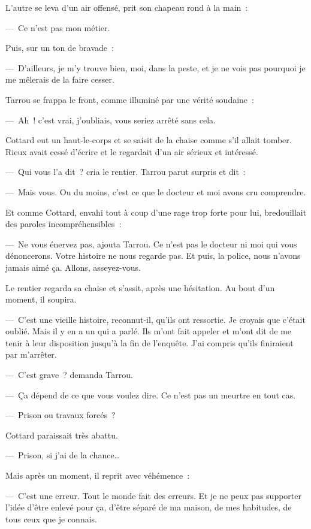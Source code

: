 \documentclass[french,twoside]{book} %
\begin{document}
L’autre se leva d’un air offensé, prit son chapeau rond à la main :\par
— Ce n’est pas mon métier.\par
Puis, sur un ton de bravade :\par
— D’ailleurs, je m’y trouve bien, moi, dans la peste, et je ne vois pas pourquoi je me mêlerais de la faire cesser.\par
Tarrou se frappa le front, comme illuminé par une vérité soudaine :\par
— Ah ! c’est vrai, j’oubliais, vous seriez arrêté sans cela.\par
Cottard eut un haut-le-corps et se saisit de la chaise comme s’il allait tomber. Rieux avait cessé d’écrire et le regardait d’un air sérieux et intéressé.\par
— Qui vous l’a dit ? cria le rentier. Tarrou parut surpris et dit :\par
— Mais vous. Ou du moins, c’est ce que le docteur et moi avons cru comprendre.\par
Et comme Cottard, envahi tout à coup d’une rage trop forte pour lui, bredouillait des paroles incompréhensibles :\par
— Ne vous énervez pas, ajouta Tarrou. Ce n’est pas le docteur ni moi qui vous dénoncerons. Votre histoire ne nous regarde pas. Et puis, la police, nous n’avons jamais aimé ça. Allons, asseyez-vous.\par
Le rentier regarda sa chaise et s’assit, après une hésitation. Au bout d’un moment, il soupira.\par
— C’est une vieille histoire, reconnut-il, qu’ils ont ressortie. Je croyais que c’était oublié. Mais il y en a un qui a parlé. Ils m’ont fait appeler et m’ont dit de me tenir à leur disposition jusqu’à la fin de l’enquête. J’ai compris qu’ils finiraient par m’arrêter.\par
— C’est grave ? demanda Tarrou.\par
— Ça dépend de ce que vous voulez dire. Ce n’est pas un meurtre en tout cas.\par
— Prison ou travaux forcés ?\par
Cottard paraissait très abattu.\par
— Prison, si j’ai de la chance…\par
Mais après un moment, il reprit avec véhémence :\par
— C’est une erreur. Tout le monde fait des erreurs. Et je ne peux pas supporter l’idée d’être enlevé pour ça, d’être séparé de ma maison, de mes habitudes, de tous ceux que je connais.\par
\end{document}
